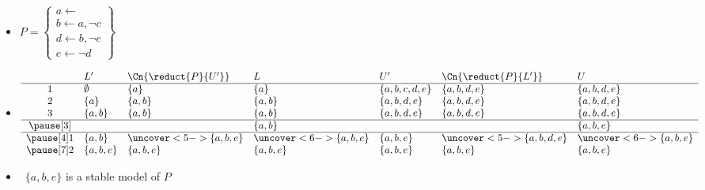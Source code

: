 \begin{frame}{}
  \begin{itemize}
  \item<1->[]
    \(
      P
      =
      \left\{
        \begin{array}{l}
          a\leftarrow\\  b\leftarrow a,\neg c\\ d\leftarrow b,\neg e\\ e\leftarrow\neg d
        \end{array}
      \right\}
    \)
  \item<2->[]\small
    \[
      \begin{array}{cllllll}
         & L'       & \Cn{\reduct{P}{U'}}   & L                     & U'            & \Cn{\reduct{P}{L'}}     & U                       \\
        \hline
        1& \emptyset&{\{a  \}}              &            {\{a    \}}& \{a,b,c,d,e\} &            {\{a,b,d,e\}}&            {\{a,b,d,e\}}\\
        2& \{a    \}&{\{a,b\}}              &            {\{a,b  \}}& \{a,b,  d,e\} &            {\{a,b,d,e\}}&            {\{a,b,d,e\}}\\
        3& \{a,b  \}&{\{a,b\}}              &            {\{a,b  \}}& \{a,b,  d,e\} &            {\{a,b,d,e\}}&            {\{a,b,d,e\}}\\
        \hline\pause[3]
         &          &                       &            {\{a,b  \}}&               &                         &            {\{a,b,  e\}}\\
        \hline\pause[4]
        1& \{a,b  \}&\uncover<5->{\{a,b,e\}}&\uncover<6->{\{a,b,e\}}& \{a,b,    e\} &\uncover<5->{\{a,b,d,e\}}&\uncover<6->{\{a,b,  e\}}\\\pause[7]
        2& \{a,b,e\}&             \{a,b,e\} &             \{a,b,e\} & \{a,b,    e\} &             \{a,b,  e\} &             \{a,b,  e\}
      \end{array}
    \]
    \medskip
  \item<7->  \ $\{a,b,e\}$ is a stable model of $P$
  \end{itemize}
\end{frame}
